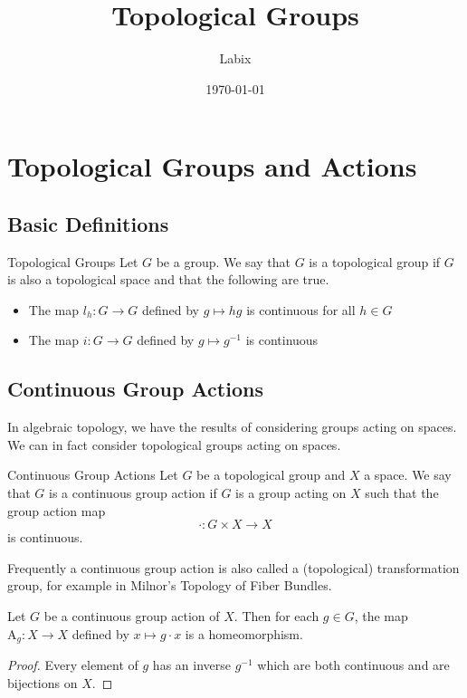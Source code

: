 \documentclass[a4paper]{article}
\title{Topological Groups}
\author{Labix}
\date{\today}
\begin{document}
\maketitle
\begin{abstract}
\end{abstract}
\pagebreak
\tableofcontents
\pagebreak

\section{Topological Groups and Actions}
\subsection{Basic Definitions}
\begin{defn}{Topological Groups}{} Let $G$ be a group. We say that $G$ is a topological group if $G$ is also a topological space and that the following are true. 
\begin{itemize}
\item The map $l_h:G\to G$ defined by $g\mapsto hg$ is continuous for all $h\in G$
\item The map $i:G\to G$ defined by $g\mapsto g^{-1}$ is continuous
\end{itemize}
\end{defn}

\subsection{Continuous Group Actions}
In algebraic topology, we have the results of considering groups acting on spaces. We can in fact consider topological groups acting on spaces. 

\begin{defn}{Continuous Group Actions}{} Let $G$ be a topological group and $X$ a space. We say that $G$ is a continuous group action if $G$ is a group acting on $X$ such that the group action map $$\cdot:G\times X\to X$$ is continuous. 
\end{defn}

Frequently a continuous group action is also called a (topological) transformation group, for example in Milnor's Topology of Fiber Bundles. 

\begin{prp}{}{} Let $G$ be a continuous group action of $X$. Then for each $g\in G$, the map $\text{A}_g:X\to X$ defined by $x\mapsto g\cdot x$ is a homeomorphism. \tcbline
\begin{proof}
Every element of $g$ has an inverse $g^{-1}$ which are both continuous and are bijections on $X$. 
\end{proof}
\end{prp}
\end{document}
